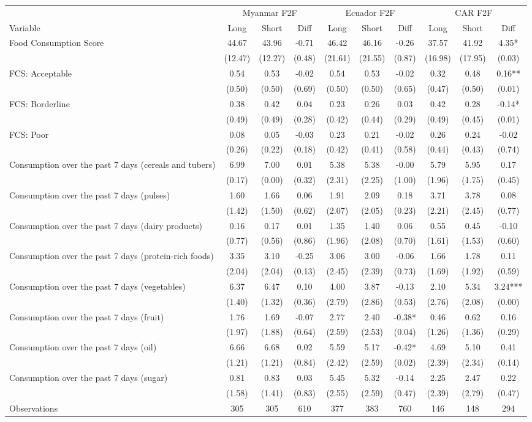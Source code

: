 \begin{tabular}{l*{9}c}
\hline\hline
 & \multicolumn{3}{c}{Myanmar F2F} & \multicolumn{3}{c}{Ecuador F2F} & \multicolumn{3}{c}{CAR F2F}\\ 
Variable & Long & Short & Diff & Long & Short & Diff & Long & Short & Diff \\
\hline
Food Consumption Score&44.67&43.96&-0.71&46.42&46.16&-0.26&37.57&41.92&4.35*\\
&(12.47)&(12.27)&(0.48)&(21.61)&(21.55)&(0.87)&(16.98)&(17.95)&(0.03)\\
FCS: Acceptable&0.54&0.53&-0.02&0.54&0.53&-0.02&0.32&0.48&0.16**\\
&(0.50)&(0.50)&(0.69)&(0.50)&(0.50)&(0.65)&(0.47)&(0.50)&(0.01)\\
FCS: Borderline&0.38&0.42&0.04&0.23&0.26&0.03&0.42&0.28&-0.14*\\
&(0.49)&(0.49)&(0.28)&(0.42)&(0.44)&(0.29)&(0.49)&(0.45)&(0.01)\\
FCS: Poor&0.08&0.05&-0.03&0.23&0.21&-0.02&0.26&0.24&-0.02\\
&(0.26)&(0.22)&(0.18)&(0.42)&(0.41)&(0.58)&(0.44)&(0.43)&(0.74)\\
Consumption over the past 7 days (cereals and tubers)&6.99&7.00&0.01&5.38&5.38&-0.00&5.79&5.95&0.17\\
&(0.17)&(0.00)&(0.32)&(2.31)&(2.25)&(1.00)&(1.96)&(1.75)&(0.45)\\
Consumption over the past 7 days (pulses)&1.60&1.66&0.06&1.91&2.09&0.18&3.71&3.78&0.08\\
&(1.42)&(1.50)&(0.62)&(2.07)&(2.05)&(0.23)&(2.21)&(2.45)&(0.77)\\
Consumption over the past 7 days (dairy products)&0.16&0.17&0.01&1.35&1.40&0.06&0.55&0.45&-0.10\\
&(0.77)&(0.56)&(0.86)&(1.96)&(2.08)&(0.70)&(1.61)&(1.53)&(0.60)\\
Consumption over the past 7 days (protein-rich foods)&3.35&3.10&-0.25&3.06&3.00&-0.06&1.66&1.78&0.11\\
&(2.04)&(2.04)&(0.13)&(2.45)&(2.39)&(0.73)&(1.69)&(1.92)&(0.59)\\
Consumption over the past 7 days (vegetables)&6.37&6.47&0.10&4.00&3.87&-0.13&2.10&5.34&3.24***\\
&(1.40)&(1.32)&(0.36)&(2.79)&(2.86)&(0.53)&(2.76)&(2.08)&(0.00)\\
Consumption over the past 7 days (fruit)&1.76&1.69&-0.07&2.77&2.40&-0.38*&0.46&0.62&0.16\\
&(1.97)&(1.88)&(0.64)&(2.59)&(2.53)&(0.04)&(1.26)&(1.36)&(0.29)\\
Consumption over the past 7 days (oil)&6.66&6.68&0.02&5.59&5.17&-0.42*&4.69&5.10&0.41\\
&(1.21)&(1.21)&(0.84)&(2.42)&(2.59)&(0.02)&(2.39)&(2.34)&(0.14)\\
Consumption over the past 7 days (sugar)&0.81&0.83&0.03&5.45&5.32&-0.14&2.25&2.47&0.22\\
&(1.58)&(1.41)&(0.83)&(2.55)&(2.59)&(0.47)&(2.39)&(2.79)&(0.47)\\
\hline
Observations & 305 & 305 & 610 & 377 & 383 & 760 & 146 & 148 & 294 \\
\hline\hline
\end{tabular}

